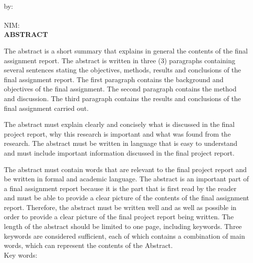
\clearpage
{}
{}
\begin{center}
    \textbf{\large{\judulen}}\\[0.5cm]
    by:\\
    \penulis\\
    NIM: \nim\\[2em]
    \textbf{ABSTRACT}\\[0.5cm]
\end{center}

The abstract is a short summary that explains in general the contents of the final assignment report. The abstract is written in three (3) paragraphs containing several sentences stating the objectives, methods, results and conclusions of the final assignment report. The first paragraph contains the background and objectives of the final assignment. The second paragraph contains the method and discussion. The third paragraph contains the results and conclusions of the final assignment carried out.

The abstract must explain clearly and concisely what is discussed in the final project report, why this research is important and what was found from the research. The abstract must be written in language that is easy to understand and must include important information discussed in the final project report.

The abstract must contain words that are relevant to the final project report and be written in formal and academic language. The abstract is an important part of a final assignment report because it is the part that is first read by the reader and must be able to provide a clear picture of the contents of the final assignment report. Therefore, the abstract must be written well and as well as possible in order to provide a clear picture of the final project report being written. The length of the abstract should be limited to one page, including keywords. Three keywords are considered sufficient, each of which contains a combination of main words, which can represent the contents of the Abstract.\\[0.6cm]

\noindent Key words: \keywords

